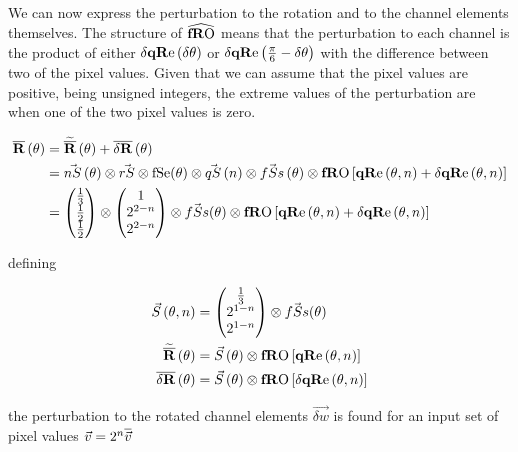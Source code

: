 We can now express the perturbation to the rotation and to the channel elements themselves. The structure of $\fROm$ means that the perturbation to each channel is the product of either $\dqRe[ \thetaA ]$ or $\dqRe[ \Pii{6} -\thetaA]$ with the difference between two of the pixel values. Given that we can assume that the pixel values are positive, being unsigned integers, the extreme values of the perturbation are when one of the two pixel values is zero.  

\begin{align*}
\nR[\theta] & = \nRa[\theta]+\dnR[\theta] \\
& = \nS[\theta] \otimes \rS \otimes \fSe (\theta) \otimes\qS[ n ] \otimes \fSs[\theta]  \otimes \fRO \left[ \qRe[ \theta, n ]  + \dqRe[ \theta, n ]  \right]  \\
& = 
\begin{pmatrix}
 \frac{1}{3}  \\
 \frac{1}{2}\\
 \frac{1}{2} \\
\end{pmatrix}
 \otimes
\begin{pmatrix}
 1  \\
 2^{2-n } \\
 2^{2-n }  \\
\end{pmatrix}
\otimes  \fSs(\theta) \otimes \fRO \left[ \qRe[ \theta, n ]  + \dqRe[ \theta, n ]  \right]   \\
\end{align*}


defining

\begin{align*}
\Scale[\theta, n]   & =
\begin{pmatrix}
  \frac{1}{3} \\
 2^{1-n } \\
 2^{1-n }  \\
\end{pmatrix}
\otimes  \fSs(\theta)    \\
\nRa[\theta]   & =  \Scale[\theta] \otimes \fRO \left[   \qRe[ \theta, n ] \right]   \\
\dnR[\theta]   & =  \Scale[\theta] \otimes \fRO \left[ \dqRe[ \theta, n ] \right] \\
\end{align*}

\newcommand{\rgb}{\vec{v}}
\newcommand{\w}{\vec{w}}
\newcommand{\dW}{\vec{\delta w}}

the perturbation to the rotated channel elements $\dW$ is found for an input set of pixel values $\rgb= 2^n\normed{\rgb} $


